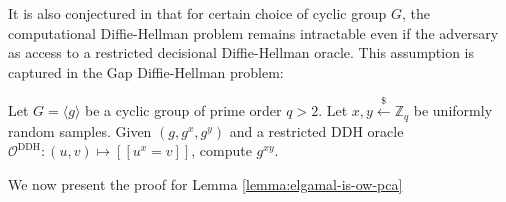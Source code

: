 \documentclass[journal=tches,submission]{iacrtrans}
\newcommand{\leftsample}{\stackrel{\$}{\leftarrow}}
\newcommand{\llbrack}{[\![}
\newcommand{\rrbrack}{]\!]}
\begin{document}
It is also conjectured in \cite{DBLP:conf/ctrsa/AbdallaBR01} that for certain choice of cyclic group $G$, the computational Diffie-Hellman problem remains intractable even if the adversary as access to a restricted decisional Diffie-Hellman oracle. This assumption is captured in the Gap Diffie-Hellman problem:

\begin{definition}
    Let $G = \langle g \rangle$ be a cyclic group of prime order $q > 2$. Let $x, y \leftsample \mathbb{Z}_q$ be uniformly random samples. Given $(g, g^x, g^y)$ and a restricted DDH oracle $\mathcal{O}^\text{DDH}: (u, v) \mapsto \llbrack u^x = v \rrbrack$, compute $g^{xy}$.
\end{definition}

We now present the proof for Lemma \ref{lemma:elgamal-is-ow-pca}
\end{document}
